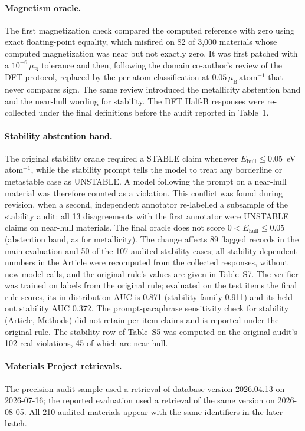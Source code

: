 \documentclass[11pt,a4paper]{article}
\begin{document}
\paragraph{Magnetism oracle.} The first magnetization check compared the computed reference with zero
using exact floating-point equality, which misfired on 82 of 3{,}000 materials whose computed
magnetization was near but not exactly zero. It was first patched with a $10^{-6}\,\mu_{\mathrm{B}}$
tolerance and then, following the domain co-author's review of the DFT protocol, replaced by the
per-atom classification at $0.05\,\mu_{\mathrm{B}}\,\mathrm{atom}^{-1}$ that never compares sign. The same
review introduced the metallicity abstention band and the near-hull wording for stability. The DFT
Half-B responses were re-collected under the final definitions before the audit reported in Table~1.

\paragraph{Stability abstention band.} The original stability oracle required a STABLE claim whenever
$E_{\mathrm{hull}}\le0.05$~eV\,atom$^{-1}$, while the stability prompt tells the model to treat any borderline or
metastable case as UNSTABLE. A model following the prompt on a near-hull material was therefore counted as a
violation. This conflict was found during revision, when a second, independent annotator re-labelled a subsample of
the stability audit: all 13 disagreements with the first annotator were UNSTABLE claims on near-hull materials.
The final oracle does not score $0<E_{\mathrm{hull}}\le0.05$ (abstention band, as for metallicity). The change affects
89 flagged records in the main evaluation and 50 of the 107 audited stability cases; all stability-dependent numbers
in the Article were recomputed from the collected responses, without new model calls, and the original rule's
values are given in Table~S7. The verifier was trained on labels from the original rule; evaluated on the test items
the final rule scores, its in-distribution AUC is 0.871 (stability family 0.911) and its held-out stability AUC 0.372.
The prompt-paraphrase sensitivity check for stability (Article, Methods) did not retain per-item claims and is
reported under the original rule. The stability row of Table~S5 was computed on the original audit's 102 real
violations, 45 of which are near-hull.

\paragraph{Materials Project retrievals.} The precision-audit sample used a retrieval of database
version 2026.04.13 on 2026-07-16; the reported evaluation used a retrieval of the same version on
2026-08-05. All 210 audited materials appear with the same identifiers in the later batch.
\end{document}
